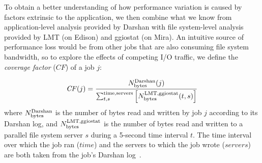To obtain a better understanding of how performance variation is caused by factors extrinsic to the application, we then combine what we know from application-level analysis provided by Darshan with file system-level analysis provided by LMT (on Edison) and ggiostat (on Mira).  An intuitive source of performance loss would be from other jobs that are also consuming file system bandwidth, so to explore the effects of competing I/O traffic, we define the \emph{coverage factor} ($\mathit{CF}$) of a job $j$:

\begin{equation} \label{eq:cf}
    \mathit{CF}(j) = \frac{N_{\textup{bytes}}^{\textup{Darshan}}(j)}
    {\sum_{t,s}^{\textup{time,servers}}
    \left [ N_{\textup{bytes}}^{\textup{LMT,ggiostat}}(t,s) \right ] }
\end{equation}
%
where $N_{\textup{bytes}}^{\textup{Darshan}}$ is the number of bytes read and written by job $j$ according to its Darshan log, and $N_{\textup{bytes}}^{\textup{LMT,ggiostat}}$ is the number of bytes read and written to a parallel file system server $s$ during a 5-second time interval $t$.
The time interval over which the job ran ($\mathit{time}$) and the servers to which the job wrote ($\mathit{servers}$) are both taken from the job's Darshan log~\cite{snyder2016modular}.

